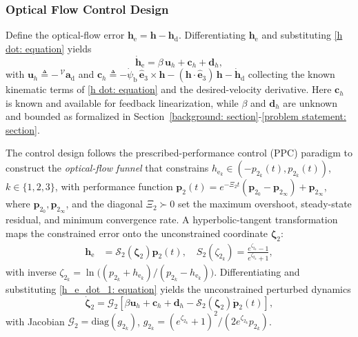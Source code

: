 \documentclass{IEEEtaes}
\begin{document}
\subsubsection{Optical Flow Control Design} \label{optic flow control: section}
Define the optical-flow error $\boldsymbol{h}_\text{e}=\boldsymbol{h}-\boldsymbol{h}_\text{d}$. Differentiating $\boldsymbol{h}_\text{e}$ and substituting \eqref{h dot: equation} yields
\begin{equation} \label{h_e_dot_1: equation}
    \dot{\boldsymbol{h}}_\text{e} = \beta\,\boldsymbol{u}_h + \boldsymbol{c}_h + \boldsymbol{d}_h,
\end{equation}
with $\boldsymbol{u}_h \triangleq -\,^\mathcal{V}\boldsymbol{a}_\text{d}$ and $\boldsymbol{c}_h \triangleq -\dot{\psi}_\text{b}\,\hat{\boldsymbol{e}}_3\times\boldsymbol{h} - (\boldsymbol{h}\cdot\hat{\boldsymbol{e}}_3)\,\boldsymbol{h} - \dot{\boldsymbol{h}}_\text{d}$ collecting the known kinematic terms of \eqref{h dot: equation} and the desired-velocity derivative. Here $\boldsymbol{c}_h$ is known and available for feedback linearization, while $\beta$ and $\boldsymbol{d}_h$ are unknown and bounded as formalized in Section~\ref{background: section}-\ref{problem statement: section}.

The control design follows the prescribed-performance control (PPC) paradigm \cite{lin2022} to construct the \emph{optical-flow funnel} that constrains $h_{\text{e}_k}\in(-p_{2_k}(t),p_{2_k}(t))$, $k\in\{1,2,3\}$, with performance function $\boldsymbol{p}_2(t) = e^{-\Xi_2 t}(\boldsymbol{p}_{2_0}-\boldsymbol{p}_{2_\infty})+\boldsymbol{p}_{2_\infty}$, where $\boldsymbol{p}_{2_0},\boldsymbol{p}_{2_\infty}$, and the diagonal $\Xi_2\succ 0$ set the maximum overshoot, steady-state residual, and minimum convergence rate. A hyperbolic-tangent transformation maps the constrained error onto the unconstrained coordinate $\boldsymbol{\zeta}_2$:
\begin{align}
    \label{optical flow error transformation: equation}
    \boldsymbol{h}_\text{e} &= \mathcal{S}_2(\boldsymbol{\zeta}_2)\boldsymbol{p}_2(t),\quad S_2(\zeta_{2_k}) = \frac{e^{\zeta_{2_k}}-1}{e^{\zeta_{2_k}}+1},
\end{align}
with inverse $\zeta_{2_k}=\ln\!\big((p_{2_k}+h_{\text{e}_k})/(p_{2_k}-h_{\text{e}_k})\big)$. Differentiating and substituting \eqref{h_e_dot_1: equation} yields the unconstrained perturbed dynamics
\begin{equation} \label{unconstrained system: equation}
    \dot{\boldsymbol{\zeta}}_2 = \mathcal{G}_2\!\left[\beta\boldsymbol{u}_h + \boldsymbol{c}_h + \boldsymbol{d}_h - \mathcal{S}_2(\boldsymbol{\zeta}_2)\dot{\boldsymbol{p}}_2(t)\right],
\end{equation}
with Jacobian $\mathcal{G}_2=\text{diag}(g_{2_k})$, $g_{2_k}=(e^{\zeta_{2_k}}+1)^2/(2e^{\zeta_{2_k}}p_{2_k})$.
\end{document}
